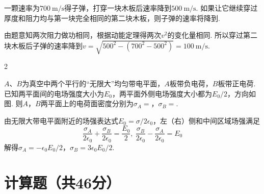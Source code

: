 \begin{problem}
    一颗速率为$\qty{700}{\m/\s}$得子弹，打穿一块木板后速率降到$\qty{500}{\m/\s}$. 如果让它继续穿过厚度和阻力均与第一块完全相同的第二块木板，则子弹的速率将降到.
\end{problem}
\begin{solution}
    由题意知两次阻力做功相同，根据动能定理得两次$v^2$的变化量相同. 所以穿过第二块木板后子弹的速率降到$v=\sqrt{500^2-(700^2-500^2)}=\qty{100}{\m/\s}$.
\end{solution}

\begin{paracol}{2}
\begin{problem}
    $A$、$B$为真空中两个平行的``无限大''均匀带电平面，$A$板带负电荷，$B$板带正电荷. 已知两平面间的电场强度大小为$E_0$，两平面外侧电场强度大小都为$E_0/2$，方向如图. 则$A$，$B$两平面上的电荷面密度分别为$\sigma_A=$，$\sigma_B=$.
    \switchcolumn\centering
\end{problem}
\end{paracol}
\begin{solution}
    由无限大带电平面附近的场强表达式$E_0=\sigma/2\epsilon_0$，左（右）侧和中间区域场强满足
    \[\frac{\sigma_A}{2\epsilon_0}+\frac{\sigma_B}{2\epsilon_0}=\frac{E_0}{2},\ \frac{\sigma_B}{2\epsilon_0}-\frac{\sigma_A}{2\epsilon_0}=E_0\]
    解得$\sigma_A=-\epsilon_0E_0/2$，$\sigma_B=3\epsilon_0E_0/2$.
\end{solution}

\section{计算题（共46分）}

